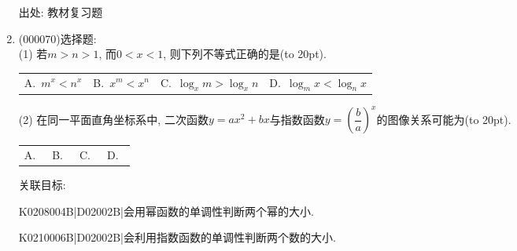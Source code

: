 \documentclass[10pt,a4paper]{article}
\newcommand{\bracket}[1]{(\hbox to #1pt{})}
\newcommand{\fourch}[4]{\par\begin{tabular}{p{.23\textwidth}p{.23\textwidth}p{.23\textwidth}p{.23\textwidth}}
A.~#1 &B.~#2& C.~#3& D.~#4
\end{tabular}}
\begin{document}
\begin{enumerate}[1.]
出处: 教材复习题
\item { (000070)}选择题:\\
(1) 若$m>n>1$, 而$0<x<1$, 则下列不等式正确的是\bracket{20}.
\fourch{$m^x<n^x$}{$x^m<x^n$}{$\log_x m>\log_x n$}{$\log_m x<\log_n x$}
(2) 在同一平面直角坐标系中, 二次函数$y=ax^2+bx$与指数函数$y=(\dfrac ba)^x$的图像关系可能为\bracket{20}.
\fourch{
\begin{tikzpicture}[scale = 0.5, >=latex]
    \draw [->] (-2.5,0) -- (2.5,0) node [below] {$x$};
    \draw [->] (0,-2.) -- (0,2.5) node [left] {$y$};
    \draw (0,0) node [below right] {$O$};
    \draw (-1,0.1) -- (-1,0) node [below] {$-1$};
    \draw (0.1,1) -- (0,1) node [left] {$1$};
    \draw [domain = -1.2:0.7,thick] plot (\x,{3*\x * (\x+0.5)});
    \draw [domain = -1.4:2,thick] plot (\x,{(0.5)^\x}); 
\end{tikzpicture}
}{
\begin{tikzpicture}[scale = 0.5, >=latex]
    \draw [->] (-2.5,0) -- (2.5,0) node [below] {$x$};
    \draw [->] (0,-2.) -- (0,2.5) node [left] {$y$};
    \draw (0,0) node [below left] {$O$};
    \draw (1,0.1) -- (1,0) node [below] {$1$};
    \draw (0.1,1) -- (0,1) node [above right] {$1$};
    \draw [domain = -0.5:1.5,thick] plot (\x,{3*\x*(\x-1)});
    \draw [domain = -1.4:2,thick] plot (\x,{(0.5)^\x}); 
\end{tikzpicture}
}{
\begin{tikzpicture}[scale = 0.5, >=latex]
    \draw [->] (-2.5,0) -- (2.5,0) node [below] {$x$};
    \draw [->] (0,-2.) -- (0,2.5) node [left] {$y$};
    \draw (0,0) node [below left] {$O$};
    \draw (1,0.1) -- (1,0) node [below] {$1$};
    \draw (0.1,1) -- (0,1) node [left] {$1$};
    \draw [domain = -0.5:2.5,thick] plot ({\x},{-\x*(\x-2)});
    \draw [domain = -1.4:2,thick] plot ({-\x},{(0.5)^\x}); 
\end{tikzpicture}
}{
\begin{tikzpicture}[scale = 0.5, >=latex]
    \draw [->] (-2.5,0) -- (2.5,0) node [below] {$x$};
    \draw [->] (0,-2.) -- (0,2.5) node [left] {$y$};
    \draw (0,0) node [below right] {$O$};
    \draw (-1,0.1) -- (-1,0) node [below] {$-1$};
    \draw (0.1,1) -- (0,1) node [right] {$1$};
    \draw [domain = -2.5:0.5,thick] plot ({\x},{-\x*(\x+2)});
    \draw [domain = -1.4:2,thick] plot ({\x},{(0.5)^\x}); 
\end{tikzpicture}   
}


关联目标:

K0208004B|D02002B|会用幂函数的单调性判断两个幂的大小.

K0210006B|D02002B|会利用指数函数的单调性判断两个数的大小.


\end{enumerate}
\end{document}
